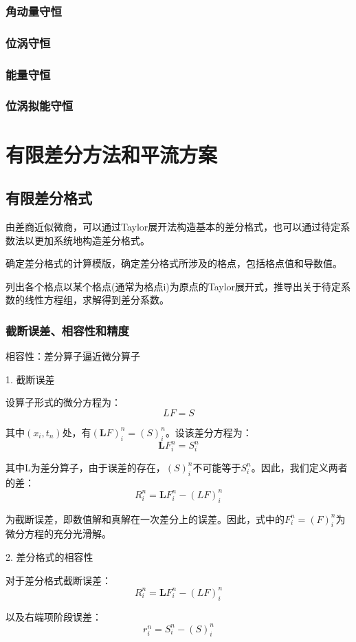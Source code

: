 \documentclass{article}
\begin{document}
\subsubsection{角动量守恒}
\subsubsection{位涡守恒}
\subsubsection{能量守恒}
\subsubsection{位涡拟能守恒}

\newpage

\section{有限差分方法和平流方案}
\subsection{有限差分格式}
由差商近似微商，可以通过Taylor展开法构造基本的差分格式，也可以通过待定系数法以更加系统地构造差分格式。

确定差分格式的计算模版，确定差分格式所涉及的格点，包括格点值和导数值。

列出各个格点以某个格点(通常为格点i)为原点的Taylor展开式，推导出关于待定系数的线性方程组，求解得到差分系数。
\subsubsection{截断误差、相容性和精度}
相容性：差分算子逼近微分算子

1. 截断误差

设算子形式的微分方程为：
$$LF = S$$

其中$(x_i, t_n)$处，有$(\mathbf{L}F)_i^n = (S)_i^n$。设该差分方程为：
$$\mathbf{L}F_i^n = S_i^n$$

其中L为差分算子，由于误差的存在，$(S)_i^n$不可能等于$S_i^n$。因此，我们定义两者的差：
$$R_i^n = \mathbf{L}F_i^n-(LF)_i^n$$

为截断误差，即数值解和真解在一次差分上的误差。因此，式中的$F_i^n=(F)_i^n$为微分方程的充分光滑解。

2. 差分格式的相容性

对于差分格式截断误差：$$R_i^n = \mathbf{L}F_i^n-(LF)_i^n$$

以及右端项阶段误差：$$r_i^n =  S_i^n-(S)_i^n$$
\end{document}
